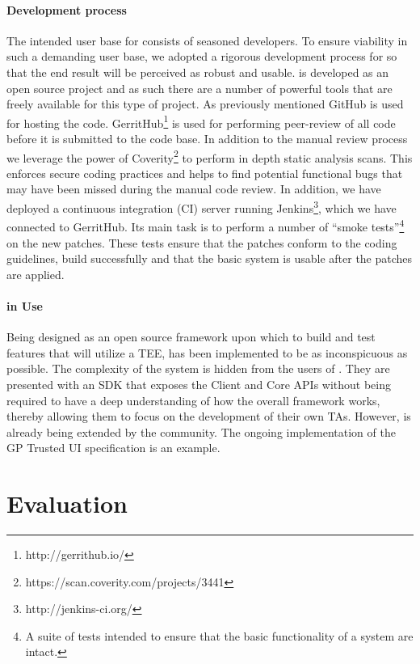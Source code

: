 \documentclass[10pt,conference,letterpaper]{IEEEtran}
\newcommand{\opentee}{\protect{TEE-Vi}\xspace}
\newcommand{\opentee}{\protect{Open-TEE}\xspace}
\begin{document}
\paragraph{Development process} The intended user base for \opentee consists of seasoned developers. To ensure viability in such a demanding user base, we adopted a rigorous development process for \opentee so that the end result will be perceived as robust and usable. \opentee is developed as an open source project and as such there are a number of powerful tools that are freely available for this type of project. As previously mentioned GitHub is used for hosting the code. GerritHub\footnote{http://gerrithub.io/} is used for performing peer-review of all code before it is submitted to the code base.  In addition to the manual review process we leverage the power of Coverity\footnote{https://scan.coverity.com/projects/3441} to perform in depth static analysis scans. This enforces secure coding practices and helps to find potential functional bugs that may have been missed during the manual code review. In addition, we have deployed a continuous integration (CI) server running Jenkins\footnote{http://jenkins-ci.org/}, which we have connected to GerritHub.  Its main task is to perform a number of ``smoke tests''\footnote{A suite of tests intended to ensure that the basic functionality of a system are intact.} on the new patches. These tests ensure that the patches conform to the coding guidelines, build successfully and that the basic system is usable after the patches are applied.

\paragraph{\opentee in Use} Being designed as an open source framework upon which to build and test features that will utilize a TEE, \opentee has been implemented to be as inconspicuous as possible. The complexity of the system is hidden from the users of \opentee.  They are presented with an SDK that exposes the Client and Core APIs without being required to have a deep understanding of how the overall framework works, thereby allowing them to focus on the development of their own TAs. However, \opentee is already being extended by the community. The ongoing implementation of the GP Trusted UI specification is an example.


 
\section{Evaluation}
\label{sec:eval}
\end{document}
